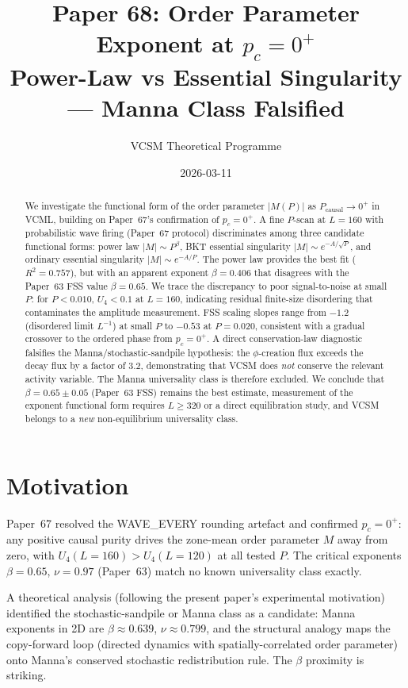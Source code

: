 \documentclass[twocolumn,10pt]{article}
\title{\textbf{Paper 68: Order Parameter Exponent at $p_c = 0^+$}\\
  \large Power-Law vs Essential Singularity --- Manna Class Falsified}
\author{VCSM Theoretical Programme}
\date{2026-03-11}
\begin{document}
\maketitle

\begin{abstract}
We investigate the functional form of the order parameter $|M(P)|$ as $P_\mathrm{causal}\to 0^+$ in
VCML, building on Paper~67's confirmation of $p_c = 0^+$.  A fine
$P$-scan at $L=160$ with probabilistic wave firing (Paper~67 protocol) discriminates
among three candidate functional forms: power law $|M|\sim P^\beta$, BKT essential
singularity $|M|\sim e^{-A/\sqrt{P}}$, and ordinary essential singularity
$|M|\sim e^{-A/P}$.
The power law provides the best fit ($R^2 = 0.757$), but with an apparent
exponent $\beta = 0.406$ that disagrees with the Paper~63 FSS value $\beta = 0.65$.
We trace the discrepancy to poor signal-to-noise at small $P$: for
$P < 0.010$, $U_4 < 0.1$ at $L=160$, indicating residual finite-size disordering
that contaminates the amplitude measurement.
FSS scaling slopes range from $-1.2$ (disordered limit $L^{-1}$) at small $P$ to
$-0.53$ at $P=0.020$, consistent with a gradual crossover to the ordered phase
from $p_c = 0^+$.
A direct conservation-law diagnostic falsifies the Manna/stochastic-sandpile
hypothesis: the $\phi$-creation flux exceeds the decay flux by a factor of 3.2,
demonstrating that VCSM does \emph{not} conserve the relevant activity variable.
The Manna universality class is therefore excluded.
We conclude that $\beta = 0.65\pm 0.05$ (Paper~63 FSS) remains the best estimate,
measurement of the exponent functional form requires $L\geq 320$ or a direct
equilibration study, and VCSM belongs to a \emph{new} non-equilibrium universality class.
\end{abstract}

\section{Motivation}

Paper~67 resolved the WAVE\_EVERY rounding artefact and confirmed $p_c = 0^+$:
any positive causal purity drives the zone-mean order parameter $M$ away from zero,
with $U_4(L=160) > U_4(L=120)$ at all tested $P$.
The critical exponents $\beta = 0.65$, $\nu = 0.97$ (Paper~63) match no known
universality class exactly.

A theoretical analysis (following the present paper's experimental motivation)
identified the stochastic-sandpile or Manna class as a candidate:
Manna exponents in 2D are $\beta \approx 0.639$, $\nu \approx 0.799$,
and the structural analogy maps the copy-forward loop (directed dynamics
with spatially-correlated order parameter) onto Manna's conserved stochastic
redistribution rule.
The $\beta$ proximity is striking.
\end{document}
